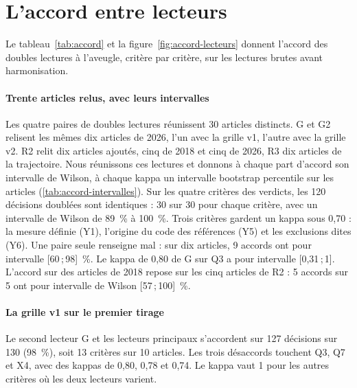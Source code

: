 \section{L'accord entre lecteurs}\label{sec:sr-accord}

Le tableau~\ref{tab:accord} et la figure~\ref{fig:accord-lecteurs} donnent l'accord des doubles lectures à
l'aveugle, critère par critère, sur les lectures brutes avant harmonisation.



\paragraph{Trente articles relus, avec leurs intervalles}
Les quatre paires de doubles lectures réunissent 30 articles distincts. G et G2 relisent les mêmes dix articles
de 2026, l'un avec la grille v1, l'autre avec la grille v2. R2 relit dix articles ajoutés, cinq de 2018 et cinq
de 2026, R3 dix articles de la trajectoire. Nous réunissons ces lectures et donnons
à chaque part d'accord son intervalle de Wilson, à chaque kappa un intervalle bootstrap percentile sur les
articles (\cref{tab:accord-intervalles}). Sur les quatre critères des verdicts, les 120 décisions doublées sont
identiques : 30 sur 30 pour chaque critère, avec un intervalle de Wilson de 89~\% à 100~\%. Trois critères
gardent un kappa sous 0,70 : la mesure définie (Y1), l'origine du code des références (Y5) et les exclusions
dites (Y6). Une paire seule renseigne mal : sur dix articles, 9 accords ont pour intervalle [60\,;\,98]~\%. Le
kappa de 0,80 de G sur Q3 a pour intervalle [0,31\,;\,1]. L'accord sur des articles de 2018 repose sur les cinq
articles de R2 : 5 accords sur 5 ont pour intervalle de Wilson [57\,;\,100]~\%.


\paragraph{La grille v1 sur le premier tirage}
Le second lecteur G et les lecteurs principaux s'accordent sur 127 décisions sur 130 (98~\%), soit 13
critères sur 10 articles. Les trois désaccords touchent Q3, Q7 et X4, avec des kappas de 0,80, 0,78 et
0,74. Le kappa vaut 1 pour les autres critères où les deux lecteurs varient.

